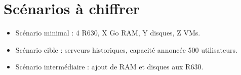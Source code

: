 \section{Scénarios à chiffrer}
\begin{todobox}[À produire]
\begin{itemize}
  \item Scénario minimal : 4 R630, X Go RAM, Y disques, Z VMs.
  \item Scénario cible : serveurs historiques, capacité annoncée 500 utilisateurs.
  \item Scénario intermédiaire : ajout de RAM et disques aux R630.
\end{itemize}
\end{todobox}